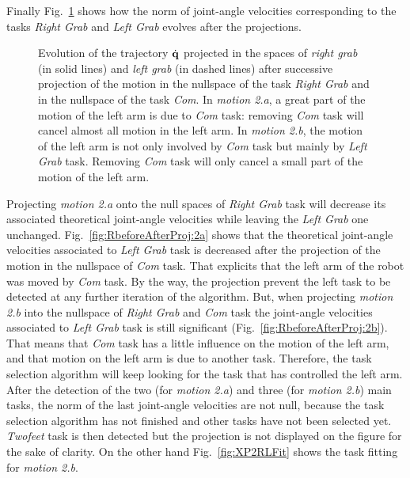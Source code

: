 \documentclass[journal]{IEEEtran}
\begin{document}
Finally Fig.~\ref{fig:RbeforeAfterProj} shows how the norm of joint-angle velocities corresponding to the tasks
\emph{Right Grab} and \emph{Left Grab} evolves after the projections.
\begin{figure}[p]
\centering
  \subfigure[Motion 2.a]{
  \resizebox{.48\textwidth}{!} {
      
    }
  \label{fig:RbeforeAfterProj:2a}
  }
  \subfigure[Motion 2.b]{
  \resizebox{.48\textwidth}{!} {
      
  }
  \label{fig:RbeforeAfterProj:2b}
  }
  \caption{Evolution of the trajectory $\dot{{\mathbf{q}}}$ projected in the spaces of
  \emph{right grab} (in solid lines) and 
  \emph{left grab} (in dashed lines) after
  successive projection of the motion in the nullspace of the task \emph{Right Grab} and in the nullspace
  of the task \emph{Com}. In \emph{motion 2.a}, a great part of the motion of the left arm is due to 
  \emph{Com} task: removing \emph{Com} task will cancel almost all motion in the left arm.
  In \emph{motion 2.b}, the motion of the left arm is not only involved by \emph{Com} task
  but mainly by \emph{Left Grab} task. Removing \emph{Com} task will only
  cancel a small part of the motion of the left arm.}
\label{fig:RbeforeAfterProj}
\end{figure}
Projecting \emph{motion 2.a} onto the null spaces of
\emph{Right Grab} task will decrease its associated theoretical joint-angle velocities while leaving the
\emph{Left Grab} one unchanged. Fig.~\ref{fig:RbeforeAfterProj:2a} shows
that the theoretical joint-angle velocities associated to 
\emph{Left Grab} task is decreased after the projection of the motion in
the nullspace of \emph{Com} task.  That explicits that
the left arm of the robot was moved by \emph{Com} task.
By the way, the projection prevent the left task to be detected at any further iteration of
the algorithm.
But, when projecting \emph{motion 2.b} into the nullspace of \emph{Right Grab}
and \emph{Com} task the joint-angle velocities associated to \emph{Left Grab} task
is still significant (Fig.~\ref{fig:RbeforeAfterProj:2b}). That means that 
\emph{Com} task has a little influence on the
motion of the left arm, and that motion on the left arm is due
to another task. Therefore, the task selection algorithm will keep looking
for the task that has controlled the left arm.
After the detection of the two (for \emph{motion 2.a}) and three (for \emph{motion 2.b}) main tasks,
the norm of the last joint-angle velocities are not null, because 
the task selection algorithm has not finished and other tasks have not been selected yet.
\emph{Twofeet} task is then detected but the projection is not displayed on the figure for the sake of clarity.
On the other hand Fig.~\ref{fig:XP2RLFit} shows the task fitting for \emph{motion 2.b}.
\end{document}
